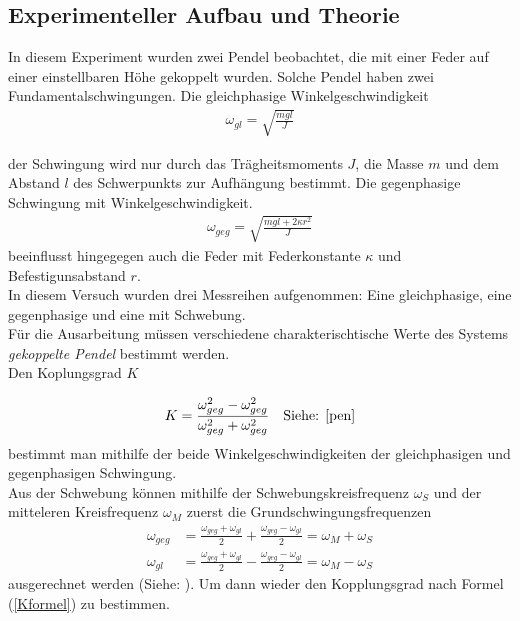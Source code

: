 \documentclass[11pt, a4paper]{article}
\begin{document}
    \subsection{Experimenteller Aufbau und Theorie}

    In diesem Experiment wurden zwei Pendel beobachtet, die mit einer Feder auf einer einstellbaren Höhe
    gekoppelt wurden. Solche Pendel haben zwei Fundamentalschwingungen. 
    Die gleichphasige Winkelgeschwindigkeit 
    \begin{align}
        \omega_{gl} = \sqrt{\frac{mgl}{J}}
    \end{align}
    
    der Schwingung
    wird nur durch das Trägheitsmoments $J$, die Masse $m$ und dem Abstand $l$ des Schwerpunkts zur Aufhängung bestimmt.
    Die gegenphasige Schwingung mit Winkelgeschwindigkeit. 
    \begin{align}
        \omega_{geg} = \sqrt{\frac{mgl+2\kappa r^2}{J}}
    \end{align}
    beeinflusst hingegegen auch die Feder mit Federkonstante $\kappa$ und Befestigunsabstand $r$. \\
    In diesem Versuch wurden drei Messreihen aufgenommen: Eine gleichphasige, eine gegenphasige und
    eine mit Schwebung.\\
    Für die Ausarbeitung müssen verschiedene charakterischtische Werte des Systems \textit{gekoppelte Pendel} bestimmt werden. \\

    Den Koplungsgrad $K$

    \begin{align} \label{Kformel}
        K = \frac{\omega_{geg}^2 - \omega_{geg}^2}{\omega_{geg}^2 + \omega_{geg}^2} \ \ \ \text{Siehe: \cite[Formel (35)]{pen}}
    \end{align}
     bestimmt man mithilfe der beide Winkelgeschwindigkeiten der gleichphasigen und gegenphasigen Schwingung. \\

    Aus der Schwebung können mithilfe der Schwebungskreisfrequenz $\omega_S$
    und der mitteleren Kreisfrequenz  $\omega_M$ zuerst die Grundschwingungsfrequenzen
    \begin{align}
        \omega_{geg} &= \frac{\omega_{geg} + \omega_{gl}}{2} + \frac{\omega_{geg} - \omega_{gl}}{2} = \omega_M + \omega_S \\
        \omega_{gl} &= \frac{\omega_{geg} + \omega_{gl}}{2} - \frac{\omega_{geg} - \omega_{gl}}{2} = \omega_M - \omega_S
    \end{align}
    ausgerechnet werden (Siehe: \cite[Formel (34)]{pen}). Um dann wieder den Kopplungsgrad nach Formel (\ref{Kformel})
    zu bestimmen. \\
\end{document}
